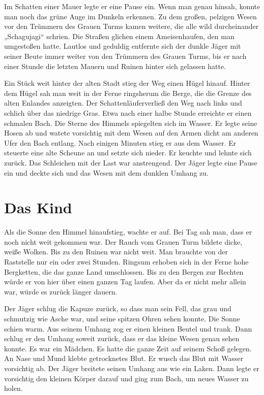\documentclass[12pt,a4paper,onecolumn,twoside,ngerman]{book}
\newcommand{\Enland}{Enland}
\newcommand{\Schattenjager}{Schattenläufer}
\begin{document}
Im Schatten einer Mauer legte er eine Pause ein. Wenn man genau hinsah, konnte man noch das grüne Auge im Dunkeln erkennen. Zu dem großen, pelzigen Wesen vor den Trümmern des Grauen Turms kamen weitere, die alle wild durcheinander „Schagujagi“ schrien. Die Straßen glichen einem Ameisenhaufen, den man umgestoßen hatte. Lautlos und geduldig entfernte sich der dunkle Jäger mit seiner Beute immer weiter von den Trümmern des Grauen Turms, bis er nach einer Stunde die letzten Mauern und Ruinen hinter sich gelassen hatte.

Ein Stück weit hinter der alten Stadt stieg der Weg einen Hügel hinauf. Hinter dem Hügel sah man weit in der Ferne ringsherum die Berge, die die Grenze des alten \Enland{es} anzeigten. Der \Schattenjager verließ den Weg nach links und schlich über das niedrige Gras. Etwa nach einer halbe Stunde erreichte er einen schmalen Bach. Die Sterne des Himmels spiegelten sich im Wasser. Er legte seine Hosen ab und watete vorsichtig mit dem Wesen auf den Armen dicht am anderen Ufer den Bach entlang. Nach einigen Minuten stieg er aus dem Wasser. Er steuerte eine alte Scheune an und setzte sich nieder. Er keuchte und lehnte sich zurück. Das Schleichen mit der Last war anstrengend. Der Jäger legte eine Pause ein und deckte sich und das Wesen mit dem dunklen Umhang zu.

\section{Das Kind}
Als die Sonne den Himmel hinaufstieg, wachte er auf. Bei Tag sah man, dass er noch nicht weit gekommen war. Der Rauch vom Grauen Turm bildete dicke, weiße Wolken. Bis zu den Ruinen war nicht weit. Man brauchte von der Raststelle nur ein oder zwei Stunden. Ringsum erhoben sich in der Ferne hohe Bergketten, die das ganze Land umschlossen. Bis zu den Bergen zur Rechten würde er von hier über einen ganzen Tag laufen. Aber da er nicht mehr allein war, würde es zurück länger dauern.

Der Jäger schlug die Kapuze zurück, so dass man sein Fell, das grau und schmutzig wie Asche war, und seine spitzen Ohren sehen konnte. Die Sonne schien warm. Aus seinem Umhang zog er einen kleinen Beutel und trank. Dann schlug er den Umhang soweit zurück, dass er das kleine Wesen genau sehen konnte. Es war ein Mädchen. Es hatte die ganze Zeit auf seinem Schoß gelegen. An Nase und Mund klebte getrocknetes Blut. Er wusch das Blut mit Wasser vorsichtig ab. Der Jäger breitete seinen Umhang aus wie ein Laken. Dann legte er vorsichtig den kleinen Körper darauf und ging zum Bach, um neues Wasser zu holen.
\end{document}
